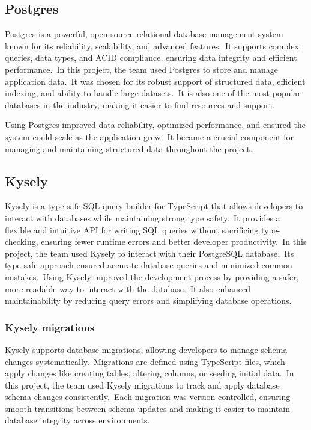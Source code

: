 \subsection{Postgres}\label{subsec:postgres}

Postgres is a powerful, open-source relational database management system known for its reliability, scalability, and advanced features.\ It supports complex queries, data types, and ACID compliance, ensuring data integrity and efficient performance.\ In this project, the team used Postgres to store and manage application data.\ It was chosen for its robust support of structured data, efficient indexing, and ability to handle large datasets.\ It is also one of the most popular databases in the industry, making it easier to find resources and support.\cite[Postgres]{postgres}

Using Postgres improved data reliability, optimized performance, and ensured the system could scale as the application grew.\ It became a crucial component for managing and maintaining structured data throughout the project.

\subsection{Kysely}\label{subsec:kysely}

Kysely is a type-safe SQL query builder for TypeScript that allows developers to interact with databases while maintaining strong type safety.\ It provides a flexible and intuitive API for writing SQL queries without sacrificing type-checking, ensuring fewer runtime errors and better developer productivity.\ In this project, the team used Kysely to interact with their PostgreSQL database.\ Its type-safe approach ensured accurate database queries and minimized common mistakes.\ Using Kysely improved the development process by providing a safer, more readable way to interact with the database.\ It also enhanced maintainability by reducing query errors and simplifying database operations.\cite[Kysely]{kysely}

\subsubsection{Kysely migrations}\label{subsubsec:kysely-migrations}

Kysely supports database migrations, allowing developers to manage schema changes systematically.\ Migrations are defined using TypeScript files, which apply changes like creating tables, altering columns, or seeding initial data.\ In this project, the team used Kysely migrations to track and apply database schema changes consistently.\ Each migration was version-controlled, ensuring smooth transitions between schema updates and making it easier to maintain database integrity across environments.

